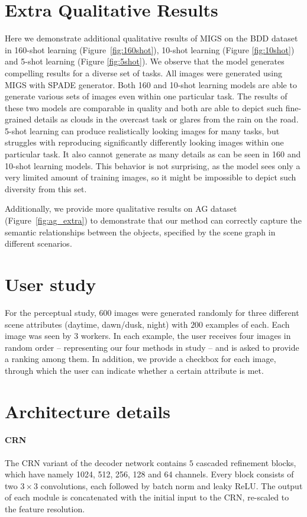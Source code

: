 \documentclass{bmvc2k}
\begin{document}
\section{Extra Qualitative Results}

Here we demonstrate additional qualitative results of MIGS on the BDD dataset in 160-shot learning (Figure~\ref{fig:160shot}), 10-shot learning (Figure \ref{fig:10shot}) and 5-shot learning (Figure \ref{fig:5shot}). We observe that the model generates compelling results for a diverse set of tasks. All images were generated using MIGS with SPADE generator. Both 160 and 10-shot learning models are able to generate various sets of images even within one particular task. The results of these two models are comparable in quality and both are able to depict such fine-grained details as clouds in the overcast task or glares from the rain on the road. 5-shot learning can produce realistically looking images for many tasks, but struggles with reproducing significantly differently looking images within one particular task. It also cannot generate as many details as can be seen in 160 and 10-shot learning models. This behavior is not surprising, as the model sees only a very limited amount of training images, so it might be impossible to depict such diversity from this set.

Additionally, we provide more qualitative results on AG dataset (Figure~\ref{fig:ag_extra}) to demonstrate that our method can correctly capture the semantic relationships between the objects, specified by the scene graph in different scenarios.

\section{User study}
For the perceptual study, $600$ images were generated randomly for three different scene attributes (daytime, dawn/dusk, night) with $200$ examples of each. Each image was seen by $3$ workers. In each example, the user receives four images in random order -- representing our four methods in study -- and is asked to provide a ranking among them. In addition, we provide a checkbox for each image, through which the user can indicate whether a certain attribute is met. 

\section{Architecture details}

\paragraph{CRN} The CRN variant of the decoder network contains $5$ cascaded refinement blocks, which have namely 1024, 512, 256, 128 and 64 channels. 
Every block consists of two $3\times3$ convolutions, each followed by batch norm and leaky ReLU. The output of each module is concatenated with the initial input to the CRN, re-scaled to the feature resolution.
\end{document}
